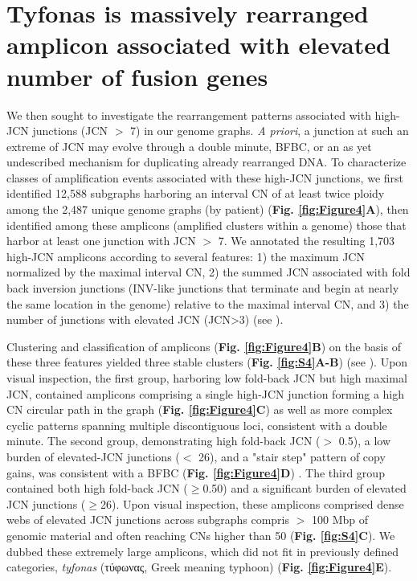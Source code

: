 \documentclass[phd,tocprelim]{cornell}
\begin{document}
\section{Tyfonas is massively rearranged amplicon associated with elevated number of fusion genes}
We then sought to investigate the rearrangement patterns associated with high-JCN junctions (JCN $>$ 7) in our genome graphs.  \textit{A priori}, a junction at such an extreme of JCN may evolve through a double minute, BFBC, or an as yet undescribed mechanism for duplicating already rearranged DNA. To characterize classes of  amplification events associated with these high-JCN junctions, we first identified 12,588 subgraphs harboring an interval CN of at least twice ploidy among the 2,487 unique genome graphs (by patient) (\textbf{Fig. \ref{fig:Figure4}A}), then identified among these amplicons (amplified clusters within a genome) those that harbor at least one junction with JCN $>$ 7.  We annotated the resulting 1,703 high-JCN amplicons according to several features: 1) the maximum JCN normalized by the maximal interval CN, 2) the summed JCN associated with fold back inversion junctions (INV-like junctions that terminate and begin at nearly the same location in the genome) relative to the maximal interval CN, and 3) the number of junctions with elevated JCN (JCN>3) (see ).

Clustering and classification of amplicons (\textbf{Fig. \ref{fig:Figure4}B}) on the basis of these three features yielded three stable clusters (\textbf{Fig. \ref{fig:S4}A-B}) (see ).  Upon visual inspection, the first group, harboring low fold-back JCN but high maximal JCN, contained amplicons comprising a single high-JCN junction forming a high CN circular path in the graph (\textbf{Fig. \ref{fig:Figure4}C}) as well as more complex cyclic patterns spanning multiple discontiguous loci, consistent with a double minute.  The second group, demonstrating high fold-back JCN ($>$ 0.5), a low burden of elevated-JCN junctions ($<$ 26), and a "stair step" pattern of copy gains, was consistent with a BFBC (\textbf{Fig. \ref{fig:Figure4}D}) \cite{Zakov:2013cm}. The third group contained both high fold-back JCN ($\geq$0.50) and a significant burden of elevated JCN junctions ($\geq$26).  Upon visual inspection, these amplicons comprised dense webs of elevated  JCN junctions across subgraphs compris $>$ 100 Mbp of genomic material and often reaching CNs higher than 50 (\textbf{Fig. \ref{fig:S4}C}).  We dubbed these extremely large amplicons, which did not fit in previously defined categories, \textit{tyfonas} (τύφωνας, Greek meaning typhoon) (\textbf{Fig. \ref{fig:Figure4}E}).
\end{document}
